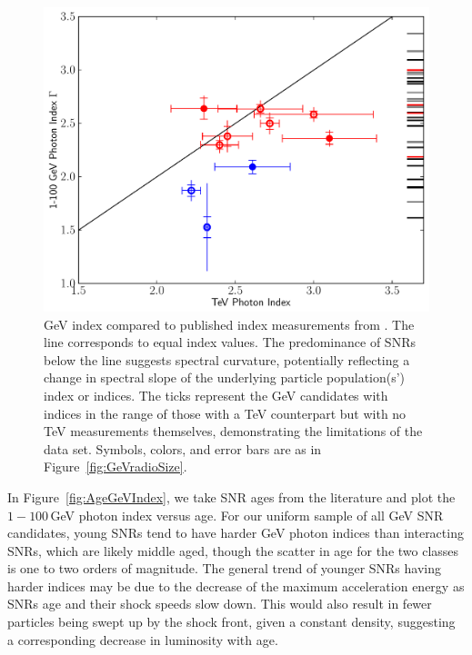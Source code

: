 \begin{figure}[h]
	\centering
	\includegraphics[width=0.8\columnwidth]{Figures/gev_vs_tev_index.pdf}
	\caption[GeV index compared to published index measurements from \iacts{}.]{GeV index compared to published index measurements from \iacts{}. The line corresponds to equal index values. The predominance of SNRs below the line suggests spectral curvature, potentially reflecting a change in spectral slope of the underlying particle population(s') index or indices. The ticks represent the GeV candidates with indices in the range of those with a TeV counterpart but with no TeV measurements themselves, demonstrating the limitations of the data set. Symbols, colors, and error bars are as in Figure~\ref{fig:GeVradioSize}. 
	}
	\label{fig:GeVTeVIndex}
\end{figure}

In Figure~\ref{fig:AgeGeVIndex}, we take SNR ages from the literature and plot the $1-100$\,GeV photon index versus age. For our uniform sample of all GeV SNR candidates, young SNRs tend to have harder GeV photon indices than interacting SNRs, which are likely middle aged, though the scatter in age for the two classes is one to two orders of magnitude. The general trend of younger SNRs having harder indices may be due to the decrease of the maximum acceleration energy as SNRs age and their shock speeds slow down. This would also result in fewer particles being swept up by the shock front, given a constant density, suggesting a corresponding decrease in luminosity with age.

